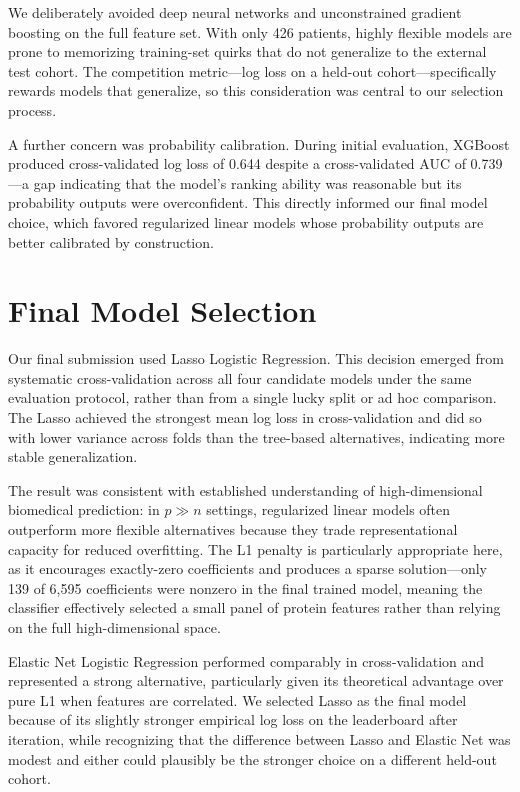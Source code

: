 \documentclass[11pt]{article}
\begin{document}
We deliberately avoided deep neural networks and unconstrained gradient boosting on the full feature set. With only 426 patients, highly flexible models are prone to memorizing training-set quirks that do not generalize to the external test cohort. The competition metric---log loss on a held-out cohort---specifically rewards models that generalize, so this consideration was central to our selection process.


A further concern was probability calibration. During initial evaluation, XGBoost produced cross-validated log loss of 0.644 despite a cross-validated AUC of 0.739---a gap indicating that the model's ranking ability was reasonable but its probability outputs were overconfident. This directly informed our final model choice, which favored regularized linear models whose probability outputs are better calibrated by construction.

\section{Final Model Selection}

Our final submission used Lasso Logistic Regression. This decision emerged from systematic cross-validation across all four candidate models under the same evaluation protocol, rather than from a single lucky split or ad hoc comparison. The Lasso achieved the strongest mean log loss in cross-validation and did so with lower variance across folds than the tree-based alternatives, indicating more stable generalization.


The result was consistent with established understanding of high-dimensional biomedical prediction: in $p \gg n$ settings, regularized linear models often outperform more flexible alternatives because they trade representational capacity for reduced overfitting. The L1 penalty is particularly appropriate here, as it encourages exactly-zero coefficients and produces a sparse solution---only 139 of 6,595 coefficients were nonzero in the final trained model, meaning the classifier effectively selected a small panel of protein features rather than relying on the full high-dimensional space.


Elastic Net Logistic Regression performed comparably in cross-validation and represented a strong alternative, particularly given its theoretical advantage over pure L1 when features are correlated. We selected Lasso as the final model because of its slightly stronger empirical log loss on the leaderboard after iteration, while recognizing that the difference between Lasso and Elastic Net was modest and either could plausibly be the stronger choice on a different held-out cohort.
\end{document}
